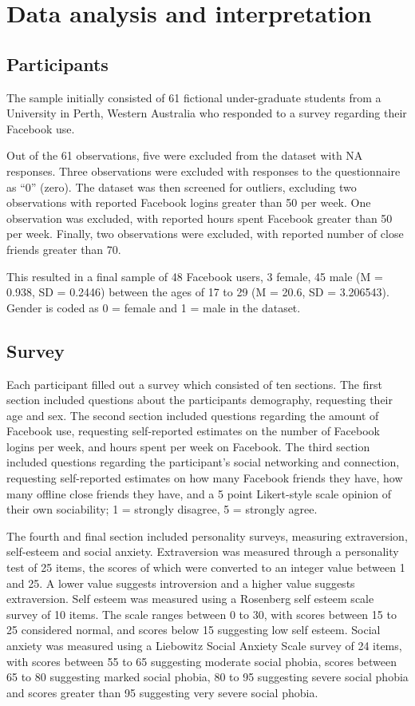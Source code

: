 \section{Data analysis and interpretation}

\subsection{Participants}

The sample initially consisted of 61 fictional under-graduate students from a University in Perth, Western Australia who responded to a survey regarding their Facebook use. 

Out of the 61 observations, five were excluded from the dataset with NA responses. Three observations were excluded with responses to the questionnaire as ``0'' (zero). The dataset was then screened for outliers, excluding two observations with reported Facebook logins greater than 50 per week. One observation was excluded, with reported hours spent Facebook greater than 50 per week. Finally, two observations were excluded, with reported number of close friends greater than 70.

This resulted in a final sample of 48 Facebook users, 3 female, 45 male (M = 0.938, SD = 0.2446) between the ages of 17 to 29 (M = 20.6, SD = 3.206543). Gender is coded as 0 = female and 1 = male in the dataset.

\subsection{Survey}

Each participant filled out a survey which consisted of ten sections. The first section included questions about the participants demography, requesting their age and sex. The second section included questions regarding the amount of Facebook use, requesting self-reported estimates on the number of Facebook logins per week, and hours spent per week on Facebook. The third section included questions regarding the participant's social networking and connection, requesting self-reported estimates on how many Facebook friends they have, how many offline close friends they have, and a 5 point Likert-style scale opinion of their own sociability; 1 = strongly disagree, 5 = strongly agree. 

The fourth and final section included personality surveys, measuring extraversion, self-esteem and social anxiety. Extraversion was measured through a personality test of 25 items, the scores of which were converted to an integer value between 1 and 25. A lower value suggests introversion and a higher value suggests extraversion. Self esteem was measured using a Rosenberg self esteem scale survey of 10 items. The scale ranges between 0 to 30, with scores between 15 to 25 considered normal, and scores below 15 suggesting low self esteem. Social anxiety was measured using a Liebowitz Social Anxiety Scale survey of 24 items, with scores between 55 to 65 suggesting moderate social phobia, scores between 65 to 80 suggesting marked social phobia, 80 to 95 suggesting severe social phobia and scores greater than 95 suggesting very severe social phobia.

